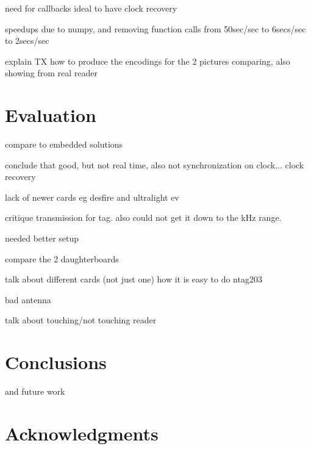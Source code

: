 \documentclass[fleqn,10pt]{SelfArx} %
\begin{document}
need for callbacks
ideal to have clock recovery


speedups due to numpy, and removing function calls from 50sec/sec to 6secs/sec to 2secs/sec


explain TX 
how to produce the encodings for the 2
pictures comparing, also showing from real reader



\section{Evaluation}
\label{sec:evaluation}

compare to embedded solutions


conclude that good, but not real time, also not synchronization on clock...
clock recovery

lack of newer cards eg desfire and ultralight ev


critique transmission for tag. also could not get it down to the kHz range.

needed better setup

compare the 2 daughterboards

talk about different cards (not just one)
how it is easy to do ntag203

bad antenna

talk about touching/not touching reader


\section{Conclusions}
\label{sec:conclusions}
and future work



\section*{Acknowledgments} %
\end{document}
